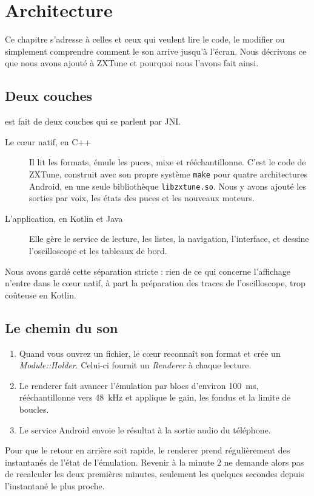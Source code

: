 \chapter{Architecture}\label{chap:architecture}

Ce chapitre s'adresse à celles et ceux qui veulent lire le code, le modifier ou simplement comprendre comment le son
arrive jusqu'à l'écran. Nous décrivons ce que nous avons ajouté à ZXTune et pourquoi nous l'avons fait ainsi.

\section{Deux couches}
\soft est fait de deux couches qui se parlent par JNI.
\begin{description}
  \item[Le cœur natif, en C++] Il lit les formats, émule les puces, mixe et rééchantillonne. C'est le code de ZXTune,
        construit avec son propre système \texttt{make} pour quatre architectures Android, en une seule
        bibliothèque \texttt{libzxtune.so}. Nous y avons ajouté les sorties par voix, les états des puces et les
        nouveaux moteurs.
  \item[L'application, en Kotlin et Java] Elle gère le service de lecture, les listes, la navigation, l'interface,
        et dessine l'oscilloscope et les tableaux de bord.
\end{description}
Nous avons gardé cette séparation stricte : rien de ce qui concerne l'affichage n'entre dans le cœur natif, à part
la préparation des traces de l'oscilloscope, trop coûteuse en Kotlin.

\section{Le chemin du son}
\begin{enumerate}
  \item Quand vous ouvrez un fichier, le cœur reconnaît son format et crée un \emph{Module::Holder}. Celui-ci
        fournit un \emph{Renderer} à chaque lecture.
  \item Le renderer fait avancer l'émulation par blocs d'environ 100~ms, rééchantillonne vers 48~kHz et applique le
        gain, les fondus et la limite de boucles.
  \item Le service Android envoie le résultat à la sortie audio du téléphone.
\end{enumerate}
Pour que le retour en arrière soit rapide, le renderer prend régulièrement des instantanés de l'état de
l'émulation. Revenir à la minute 2 ne demande alors pas de recalculer les deux premières minutes, seulement les
quelques secondes depuis l'instantané le plus proche.

